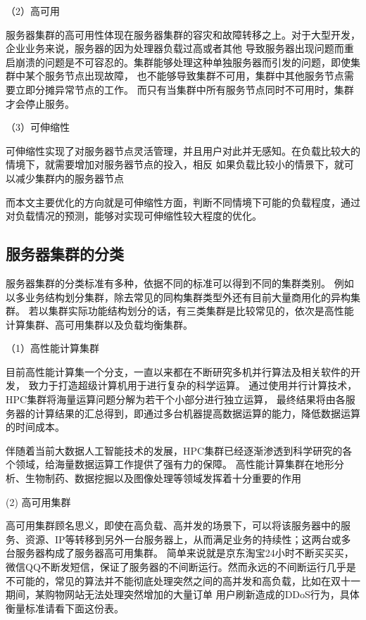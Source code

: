 （2）高可用

服务器集群的高可用性体现在服务器集群的容灾和故障转移之上\cite{刘金秀2019基于}。对于大型开发，企业业务来说，服务器的因为处理器负载过高或者其他
导致服务器出现问题而重启崩溃的问题是不可容忍的。集群能够处理这种单独服务器而引发的问题，即使集群中某个服务节点出现故障，
也不能够导致集群不可用，集群中其他服务节点需要立即分摊异常节点的工作。
而只有当集群中所有服务节点同时不可用时，集群才会停止服务。

（3）可伸缩性

可伸缩性实现了对服务器节点灵活管理，并且用户对此并无感知。在负载比较大的情境下，就需要增加对服务器节点的投入，相反
如果负载比较小的情景下，就可以减少集群内的服务器节点

而本文主要优化的方向就是可伸缩性方面，判断不同情境下可能的负载程度，通过对负载情况的预测，能够对实现可伸缩性较大程度的优化。

\subsection{服务器集群的分类}

服务器集群的分类标准有多种，依据不同的标准可以得到不同的集群类别。
例如以多业务结构划分集群，除去常见的同构集群类型外还有目前大量商用化的异构集群。
若以集群实际功能结构划分的话，有三类集群是比较常见的，依次是高性能计算集群、高可用集群以及负载均衡集群\cite{刘卓2017基于Nginx的负载均衡集群设计与实现}。

（1）高性能计算集群

目前高性能计算集一个分支，一直以来都在不断研究多机并行算法及相关软件的开发，
致力于打造超级计算机用于进行复杂的科学运算\cite{xuzongyu}。
通过使用并行计算技术，HPC集群将海量运算问题分解为若干个小部分进行独立运算，
最终结果将由各服务器的计算结果的汇总得到，即通过多台机器提高数据运算的能力，降低数据运算的时间成本。

伴随着当前大数据人工智能技术的发展，HPC集群已经逐渐渗透到科学研究的各个领域，给海量数据运算工作提供了强有力的保障。
高性能计算集群在地形分析、生物制药、数据挖掘以及图像处理等领域发挥着十分重要的作用

(2) 高可用集群

高可用集群顾名思义，即使在高负载、高并发的场景下，可以将该服务器中的服务、资源、IP等转移到另外一台服务器上，从而满足业务的持续性；这两台或多台服务器构成了服务器高可用集群。
简单来说就是京东淘宝24小时不断买买买，微信QQ不断发短信，保证了服务器的不间断运行。然而永远的不间断运行几乎是不可能的，常见的算法并不能彻底处理突然之间的高并发和高负载，比如在双十一期间，某购物网站无法处理突然增加的大量订单
用户刷新造成的DDoS行为，具体衡量标准请看下面这份表。

